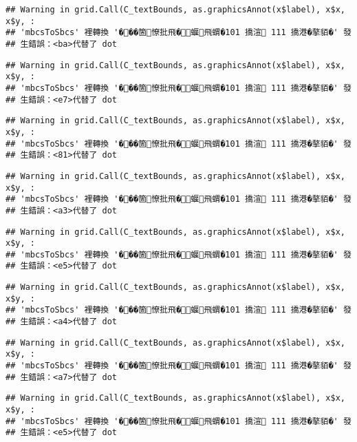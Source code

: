 \documentclass[
]{article}
\begin{document}
\begin{verbatim}
## Warning in grid.Call(C_textBounds, as.graphicsAnnot(x$label), x$x, x$y, :
## 'mbcsToSbcs' 裡轉換 '���箇憭批飛�蝘飛蝟�101 撟渲 111 撟港�摮貊�' 發
## 生錯誤：<ba>代替了 dot
\end{verbatim}

\begin{verbatim}
## Warning in grid.Call(C_textBounds, as.graphicsAnnot(x$label), x$x, x$y, :
## 'mbcsToSbcs' 裡轉換 '���箇憭批飛�蝘飛蝟�101 撟渲 111 撟港�摮貊�' 發
## 生錯誤：<e7>代替了 dot
\end{verbatim}

\begin{verbatim}
## Warning in grid.Call(C_textBounds, as.graphicsAnnot(x$label), x$x, x$y, :
## 'mbcsToSbcs' 裡轉換 '���箇憭批飛�蝘飛蝟�101 撟渲 111 撟港�摮貊�' 發
## 生錯誤：<81>代替了 dot
\end{verbatim}

\begin{verbatim}
## Warning in grid.Call(C_textBounds, as.graphicsAnnot(x$label), x$x, x$y, :
## 'mbcsToSbcs' 裡轉換 '���箇憭批飛�蝘飛蝟�101 撟渲 111 撟港�摮貊�' 發
## 生錯誤：<a3>代替了 dot
\end{verbatim}

\begin{verbatim}
## Warning in grid.Call(C_textBounds, as.graphicsAnnot(x$label), x$x, x$y, :
## 'mbcsToSbcs' 裡轉換 '���箇憭批飛�蝘飛蝟�101 撟渲 111 撟港�摮貊�' 發
## 生錯誤：<e5>代替了 dot
\end{verbatim}

\begin{verbatim}
## Warning in grid.Call(C_textBounds, as.graphicsAnnot(x$label), x$x, x$y, :
## 'mbcsToSbcs' 裡轉換 '���箇憭批飛�蝘飛蝟�101 撟渲 111 撟港�摮貊�' 發
## 生錯誤：<a4>代替了 dot
\end{verbatim}

\begin{verbatim}
## Warning in grid.Call(C_textBounds, as.graphicsAnnot(x$label), x$x, x$y, :
## 'mbcsToSbcs' 裡轉換 '���箇憭批飛�蝘飛蝟�101 撟渲 111 撟港�摮貊�' 發
## 生錯誤：<a7>代替了 dot
\end{verbatim}

\begin{verbatim}
## Warning in grid.Call(C_textBounds, as.graphicsAnnot(x$label), x$x, x$y, :
## 'mbcsToSbcs' 裡轉換 '���箇憭批飛�蝘飛蝟�101 撟渲 111 撟港�摮貊�' 發
## 生錯誤：<e5>代替了 dot
\end{verbatim}
\end{document}
